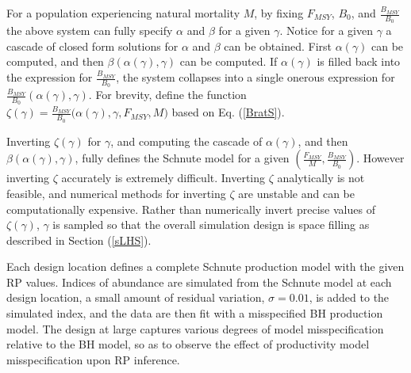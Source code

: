 \documentclass[12pt]{article}
\begin{document}
%
For a population experiencing natural mortality $M$, by fixing $F_{MSY}$, 
$B_0$, and $\frac{B_{MSY}}{B_0}$ %
the above system can fully specify $\alpha$ and $\beta$ for a given $\gamma$. %
Notice for a given $\gamma$ a cascade of closed form solutions for $\alpha$ 
and $\beta$ can be obtained. First $\alpha(\gamma)$ can be computed, and then 
$\beta(\alpha(\gamma), \gamma)$ can be computed. If $\alpha(\gamma)$ is filled 
back into the expression for $\frac{B_{MSY}}{B_0}$, the system collapses into 
a single onerous expression for $\frac{B_{MSY}}{B_0}(\alpha(\gamma), \gamma)$. 
For brevity, define the function \mbox{$\zeta(\gamma)=\frac{B_{MSY}}{B_0}\big(\alpha(\gamma), \gamma, F_{MSY}, M\big)$} based on Eq. (\ref{BratS}). 

Inverting $\zeta(\gamma)$ for $\gamma$, and computing the cascade of 
$\alpha(\gamma)$, and then $\beta(\alpha(\gamma), \gamma)$, fully defines the 
Schnute model for a given $(\frac{F_{MSY}}{M}, \frac{B_{MSY}}{B_0})$. However
inverting $\zeta$ accurately is extremely difficult. Inverting $\zeta$ 
analytically is not feasible, and numerical methods for inverting 
$\zeta$ are unstable and can be computationally expensive. 
%
Rather than numerically invert precise values of $\zeta(\gamma)$, $\gamma$ is 
sampled so that the overall simulation design is space filling as described in 
Section (\ref{sLHS}).

%
Each design location defines a complete Schnute production model with the given 
RP values. Indices of abundance are simulated from the Schnute model at each design
location, a small amount of residual variation, $\sigma=0.01$, is added to the 
simulated index, and the data are then fit with a misspecified BH production model. 
The design at large captures various degrees of model misspecification relative 
to the BH model, so as to observe the effect of productivity model misspecification 
upon RP inference.


%
\end{document}
